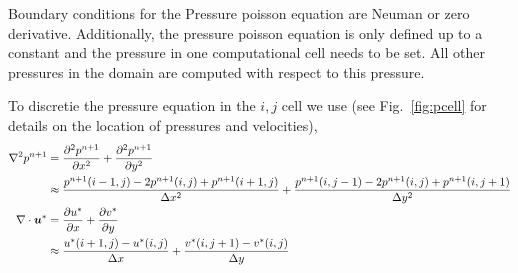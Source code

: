 \documentclass[]{article}
\def\bm#1{\mbox{\boldmath{$#1$}}}
\begin{document}
Boundary conditions for the Pressure poisson equation are Neuman or zero derivative.  Additionally, the pressure poisson equation is only defined up to a constant and the pressure in one computational cell needs to be set.  All other pressures in the domain are computed with respect to this pressure.  

To discretie the pressure equation in the $i,j$ cell we use (see Fig.~\ref{fig:pcell} for details on the location of pressures and velocities),
\begin{align}
\nabla^2 p^{n+1} &= \frac{\partial^2 p^{n+1}}{\partial x^2} +\frac{\partial^2 p^{n+1}}{\partial y^2} \nonumber\\
&\approx \frac{p^{n+1}(i-1,j)-2p^{n+1}(i,j)+p^{n+1}(i+1,j)}{\Delta x^2} + \frac{p^{n+1}(i,j-1)-2p^{n+1}(i,j)+p^{n+1}(i,j+1)}{\Delta y^2}\label{eq:Lap}\\
\nabla\cdot\bm{u}^*&=\frac{\partial u^*}{\partial x} + \frac{\partial v^*}{\partial y} \nonumber\\
& \approx \frac{u^*(i+1,j)-u^*(i,j)}{\Delta x} + \frac{v^*(i,j+1)-v^*(i,j)}{\Delta y}
\end{align}
\end{document}
